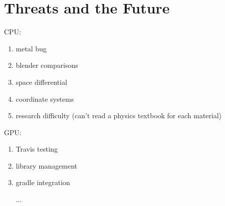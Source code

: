 \section{Threats and the Future} \label{ch:methods:threats}

CPU:
\begin{enumerate}
  \item metal bug
  \item blender comparisons
  \item space differential
  \item coordinate systems
  \item research difficulty (can't read a physics textbook for each material)
\end{enumerate}

GPU:
\begin{enumerate}
  \item Travis testing
  \item library management
  \item gradle integration
  \item [...]
\end{enumerate}
